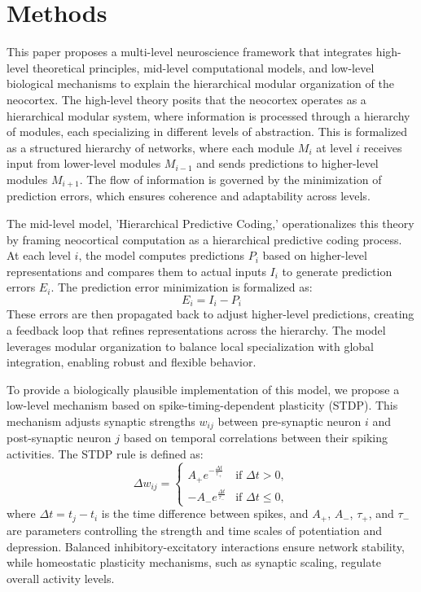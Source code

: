 \documentclass{article}
\begin{document}
\section{Methods}
This paper proposes a multi-level neuroscience framework that integrates high-level theoretical principles, mid-level computational models, and low-level biological mechanisms to explain the hierarchical modular organization of the neocortex. The high-level theory posits that the neocortex operates as a hierarchical modular system, where information is processed through a hierarchy of modules, each specializing in different levels of abstraction. This is formalized as a structured hierarchy of networks, where each module $M_i$ at level $i$ receives input from lower-level modules $M_{i-1}$ and sends predictions to higher-level modules $M_{i+1}$. The flow of information is governed by the minimization of prediction errors, which ensures coherence and adaptability across levels.

The mid-level model, 'Hierarchical Predictive Coding,' operationalizes this theory by framing neocortical computation as a hierarchical predictive coding process. At each level $i$, the model computes predictions $P_i$ based on higher-level representations and compares them to actual inputs $I_i$ to generate prediction errors $E_i$. The prediction error minimization is formalized as:
\begin{equation}
E_i = I_i - P_i
\end{equation}
These errors are then propagated back to adjust higher-level predictions, creating a feedback loop that refines representations across the hierarchy. The model leverages modular organization to balance local specialization with global integration, enabling robust and flexible behavior.

To provide a biologically plausible implementation of this model, we propose a low-level mechanism based on spike-timing-dependent plasticity (STDP). This mechanism adjusts synaptic strengths $w_{ij}$ between pre-synaptic neuron $i$ and post-synaptic neuron $j$ based on temporal correlations between their spiking activities. The STDP rule is defined as:
\begin{equation}
\Delta w_{ij} = \begin{cases}
A_+ e^{-\frac{\Delta t}{\tau_+}} & \text{if } \Delta t > 0,\\
-A_- e^{\frac{\Delta t}{\tau_-}} & \text{if } \Delta t \leq 0,
\end{cases}
\end{equation}
where $\Delta t = t_j - t_i$ is the time difference between spikes, and $A_+$, $A_-$, $\tau_+$, and $\tau_-$ are parameters controlling the strength and time scales of potentiation and depression. Balanced inhibitory-excitatory interactions ensure network stability, while homeostatic plasticity mechanisms, such as synaptic scaling, regulate overall activity levels.
\end{document}
